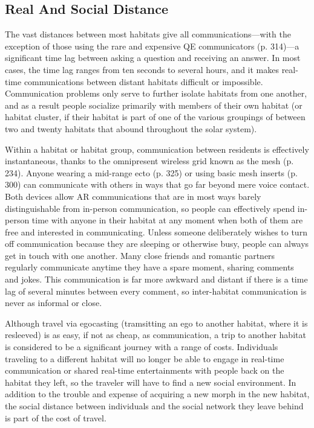 \subsection{Real And Social Distance}

The vast distances between most habitats give all communications—with
the exception of those using the
rare and expensive QE communicators (p. 314)—a 
significant time lag between asking a question and 
receiving an answer. In most cases, the time lag ranges 
from ten seconds to several hours, and it makes real-time
communications between distant habitats difficult
or impossible. Communication problems only serve to 
further isolate habitats from one another, and as a result 
people socialize primarily with members of their own 
habitat (or habitat cluster, if their habitat is part of one 
of the various groupings of between two and twenty 
habitats that abound throughout the solar system).

Within a habitat or habitat group, communication 
between residents is effectively instantaneous, thanks 
to the omnipresent wireless grid known as the mesh 
(p. 234). Anyone wearing a mid-range ecto (p. 325) 
or using basic mesh inserts (p. 300) can communicate 
with others in ways that go far beyond mere voice 
contact. Both devices allow AR communications that 
are in most ways barely distinguishable from in-person
communication, so people can effectively spend
in-person time with anyone in their habitat at any 
moment when both of them are free and interested in 
communicating. Unless someone deliberately wishes 
to turn off communication because they are sleeping 
or otherwise busy, people can always get in touch 
with one another. Many close friends and romantic 
partners regularly communicate anytime they have 
a spare moment, sharing comments and jokes. This 
communication is far more awkward and distant if 
there is a time lag of several minutes between every 
comment, so inter-habitat communication is never as 
informal or close.

Although travel via egocasting (tramsitting an ego 
to another habitat, where it is resleeved) is as easy, 
if not as cheap, as communication, a trip to another 
habitat is considered to be a significant journey with 
a range of costs. Individuals traveling to a different 
habitat will no longer be able to engage in real-time 
communication or shared real-time entertainments 
with people back on the habitat they left, so the 
traveler will have to find a new social environment. 
In addition to the trouble and expense of acquiring 
a new morph in the new habitat, the social distance 
between individuals and the social network they leave 
behind is part of the cost of travel.


